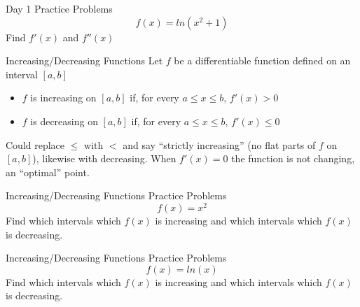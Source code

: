 \documentclass[aspectratio=169]{beamer}
\begin{document}
\begin{frame}{Day 1 Practice Problems}\label{main1}
	\vspace{-4cm}
    \[
    f(x) = ln(x^{2} + 1)
    \]
    Find \( f'(x) \) and \( f''(x) \)
\end{frame}

\begin{frame}{Increasing/Decreasing Functions}\label{main1}
    Let $f$ be a differentiable function defined on an interval $[a, b]$
    \begin{itemize}
        \item $f$ is increasing on $[a, b]$ if, for every $a \leq x \leq b$, $f'(x) > 0$
        \item $f$ is decreasing on $[a, b]$ if, for every $a \leq x \leq b$, $f'(x) \leq 0$
    \end{itemize}
    Could replace $\leq$ with $<$ and say “strictly increasing” (no flat parts of $f$ on $[a, b]$), likewise with decreasing. When $f'(x) = 0$ the function is not changing, an “optimal” point.

\end{frame}

\begin{frame}{Increasing/Decreasing Functions Practice Problems}\label{main1}
	\vspace{-4cm}
     \[
    f(x) = x^{2}
    \]
    Find which intervals which \( f(x) \) is increasing and which intervals which \( f(x) \) is decreasing.
\end{frame}

\begin{frame}{Increasing/Decreasing Functions Practice Problems}\label{main1}
	\vspace{-4cm}
     \[
    f(x) = ln(x)
    \]
    Find which intervals which \( f(x) \) is increasing and which intervals which \( f(x) \) is decreasing.
\end{frame}
\end{document}
